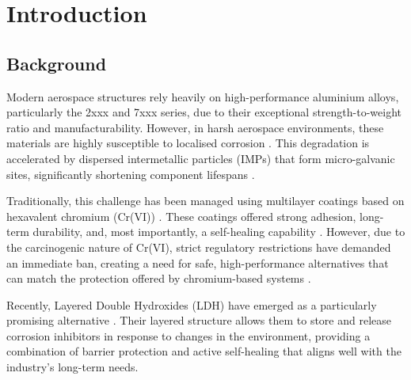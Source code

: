 \documentclass[11pt,twoside,a4paper,final]{report}
\begin{document}

\MakeCover


\tableofcontents

\listoffigures
\listoftables

\newpage


\chapter{Introduction}
\section{Background}

Modern aerospace structures rely heavily on high-performance aluminium alloys, particularly the 2xxx and 7xxx series, due to their exceptional strength-to-weight ratio and manufacturability. However, in harsh aerospace environments, these materials are highly susceptible to localised corrosion \cite{MartinezViademonte2020,Garg2025}. This degradation is accelerated by dispersed intermetallic particles (IMPs) that form micro-galvanic sites, significantly shortening component lifespans \cite{MartinezViademonte2020,Becker2019,Garg2025}.

Traditionally, this challenge has been managed using multilayer coatings based on hexavalent chromium (Cr(VI)) \cite{MartinezViademonte2020,BoualiReview2020}. These coatings offered strong adhesion, long-term durability, and, most importantly, a self-healing capability \cite{MartinezViademonte2020,Becker2019,BoualiReview2020}. However, due to the carcinogenic nature of Cr(VI), strict regulatory restrictions have demanded an immediate ban, creating a need for safe, high-performance alternatives that can match the protection offered by chromium-based systems \cite{MartinezViademonte2020,Becker2019,Bouali2020}.

Recently, Layered Double Hydroxides (LDH) have emerged as a particularly promising alternative \cite{Cao2022,Becker2019,Bouali2020,Zhou2017,Iuzviuk2020,BoualiReview2020}. Their layered structure allows them to store and release corrosion inhibitors in response to changes in the environment, providing a combination of barrier protection and active self-healing that aligns well with the industry's long-term needs.
\end{document}
